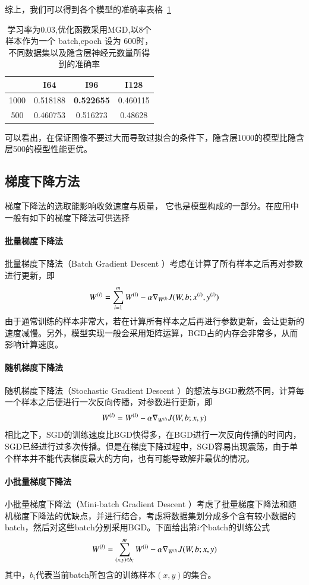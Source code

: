 综上，我们可以得到各个模型的准确率表格~\ref{table:bp1}
\begin{table}[htb]
\centering
\caption{学习率为0.03,优化函数采用MGD,以8个样本作为一个 batch,epoch 设为 600时，不同数据集以及隐含层神经元数量所得到的准确率}
\begin{tabular}{cccc}
\toprule[2pt]
\  & I64 & I96 & I128 \\ 
\midrule[1pt]
1000 & 0.518188 & \textbf{0.522655} & 0.460115 \\ 
500 & 0.460753 & 0.516273 & 0.48628 \\ 
\bottomrule[2pt]
\end{tabular} 
\label{table:bp1} 
\end{table}
可以看出，在保证图像不要过大而导致过拟合的条件下，隐含层1000的模型比隐含层500的模型性能更优。

\subsection{梯度下降方法}
梯度下降法的选取能影响收敛速度与质量，	它也是模型构成的一部分。在应用中一般有如下的梯度下降法可供选择
\paragraph{批量梯度下降法}
批量梯度下降法（Batch Gradient Descent ）考虑在计算了所有样本之后再对参数进行更新，即
\begin{eqnarray}
{W}^{({l})}=\sum_{i=1}^m{W}^{({l})}-\alpha\nabla_{{W}^{({l})}}J(W,b;{x}^{({i})},{y}^{({i})})
\end{eqnarray} 
由于通常训练的样本非常大，若在计算所有样本之后再进行参数更新，会让更新的速度减慢。另外，模型实现一般会采用矩阵运算，BGD占的内存会非常多，从而影响计算速度。
\paragraph{随机梯度下降法}
随机梯度下降法（Stochastic Gradient Descent ）的想法与BGD截然不同，计算每一个样本之后便进行一次反向传播，对参数进行更新，即
\begin{eqnarray}
{W}^{({l})}={W}^{({l})}-\alpha\nabla_{{W}^{({l})}}J(W,b;x,y)
\end{eqnarray}
相比之下，SGD的训练速度比BGD快得多，在BGD进行一次反向传播的时间内，SGD已经进行过多次传播。但是在梯度下降过程中，SGD容易出现震荡，由于单个样本并不能代表梯度最大的方向，也有可能导致解非最优的情况。
\paragraph{小批量梯度下降法}
小批量梯度下降法（Mini-batch Gradient Descent ）考虑了批量梯度下降法和随机梯度下降法的优缺点，并进行结合，考虑将数据集划分成多个含有较小数据的batch，然后对这些batch分别采用BGD。下面给出第$i$个batch的训练公式
\begin{eqnarray}
{W}^{({l})}=\sum_{(x,y)\in b_i}^m{W}^{({l})}-\alpha\nabla_{{W}^{({l})}}J(W,b;x,y)
\end{eqnarray}
其中，$b_i$代表当前batch所包含的训练样本$(x,y)$的集合。
